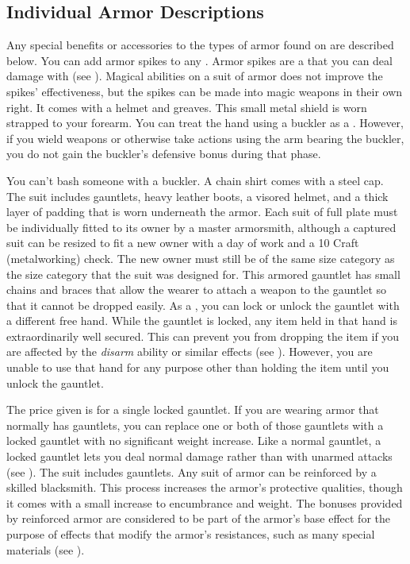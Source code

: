     \subsection{Individual Armor Descriptions}
        Any special benefits or accessories to the types of armor found on  are described below.
         You can add armor spikes to any .
        Armor spikes are a  that you can deal damage with (see ).
        Magical abilities on a suit of armor does not improve the spikes' effectiveness, but the spikes can be made into magic weapons in their own right.
         It comes with a helmet and greaves.
         This small metal shield is worn strapped to your forearm.
        You can treat the hand using a buckler as a .
        However, if you wield weapons or otherwise take actions using the arm bearing the buckler, you do not gain the buckler's defensive bonus during that phase.
        \par You can't bash someone with a buckler.
         A chain shirt comes with a steel cap.
         The suit includes gauntlets, heavy leather boots, a visored helmet, and a thick layer of padding that is worn underneath the armor. Each suit of full plate must be individually fitted to its owner by a master armorsmith, although a captured suit can be resized to fit a new owner with a day of work and a  10 Craft (metalworking) check. The new owner must still be of the same size category as the size category that the suit was designed for.
         This armored gauntlet has small chains and braces that allow the wearer to attach a weapon to the gauntlet so that it cannot be dropped easily.
        As a , you can lock or unlock the gauntlet with a different free hand.
        While the gauntlet is locked, any item held in that hand is extraordinarily well secured.
        This can prevent you from dropping the item if you are affected by the \textit{disarm} ability or similar effects (see ).
        However, you are unable to use that hand for any purpose other than holding the item until you unlock the gauntlet.
        \par The price given is for a single locked gauntlet.
        If you are wearing armor that normally has gauntlets, you can replace one or both of those gauntlets with a locked gauntlet with no significant weight increase.
        Like a normal gauntlet, a locked gauntlet lets you deal normal damage rather than  with unarmed attacks (see ).
         The suit includes gauntlets.
         Any suit of armor can be reinforced by a skilled blacksmith.
        This process increases the armor's protective qualities, though it comes with a small increase to encumbrance and weight.
        The bonuses provided by reinforced armor are considered to be part of the armor's base effect for the purpose of effects that modify the armor's resistances, such as many special materials (see ).

